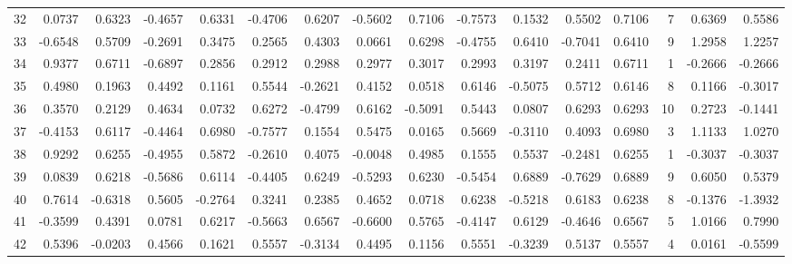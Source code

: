 \begin{tabular}{lrrrrrrrrrrrrrrr}
32  &      0.0737 &  0.6323 & -0.4657 &  0.6331 & -0.4706 &  0.6207 & -0.5602 &  0.7106 & -0.7573 &  0.1532 &   0.5502 &     0.7106 &      7 &                    0.6369 &                     0.5586 \\
33  &     -0.6548 &  0.5709 & -0.2691 &  0.3475 &  0.2565 &  0.4303 &  0.0661 &  0.6298 & -0.4755 &  0.6410 &  -0.7041 &     0.6410 &      9 &                    1.2958 &                     1.2257 \\
34  &      0.9377 &  0.6711 & -0.6897 &  0.2856 &  0.2912 &  0.2988 &  0.2977 &  0.3017 &  0.2993 &  0.3197 &   0.2411 &     0.6711 &      1 &                   -0.2666 &                    -0.2666 \\
35  &      0.4980 &  0.1963 &  0.4492 &  0.1161 &  0.5544 & -0.2621 &  0.4152 &  0.0518 &  0.6146 & -0.5075 &   0.5712 &     0.6146 &      8 &                    0.1166 &                    -0.3017 \\
36  &      0.3570 &  0.2129 &  0.4634 &  0.0732 &  0.6272 & -0.4799 &  0.6162 & -0.5091 &  0.5443 &  0.0807 &   0.6293 &     0.6293 &     10 &                    0.2723 &                    -0.1441 \\
37  &     -0.4153 &  0.6117 & -0.4464 &  0.6980 & -0.7577 &  0.1554 &  0.5475 &  0.0165 &  0.5669 & -0.3110 &   0.4093 &     0.6980 &      3 &                    1.1133 &                     1.0270 \\
38  &      0.9292 &  0.6255 & -0.4955 &  0.5872 & -0.2610 &  0.4075 & -0.0048 &  0.4985 &  0.1555 &  0.5537 &  -0.2481 &     0.6255 &      1 &                   -0.3037 &                    -0.3037 \\
39  &      0.0839 &  0.6218 & -0.5686 &  0.6114 & -0.4405 &  0.6249 & -0.5293 &  0.6230 & -0.5454 &  0.6889 &  -0.7629 &     0.6889 &      9 &                    0.6050 &                     0.5379 \\
40  &      0.7614 & -0.6318 &  0.5605 & -0.2764 &  0.3241 &  0.2385 &  0.4652 &  0.0718 &  0.6238 & -0.5218 &   0.6183 &     0.6238 &      8 &                   -0.1376 &                    -1.3932 \\
41  &     -0.3599 &  0.4391 &  0.0781 &  0.6217 & -0.5663 &  0.6567 & -0.6600 &  0.5765 & -0.4147 &  0.6129 &  -0.4646 &     0.6567 &      5 &                    1.0166 &                     0.7990 \\
42  &      0.5396 & -0.0203 &  0.4566 &  0.1621 &  0.5557 & -0.3134 &  0.4495 &  0.1156 &  0.5551 & -0.3239 &   0.5137 &     0.5557 &      4 &                    0.0161 &                    -0.5599 \\

\end{tabular}
